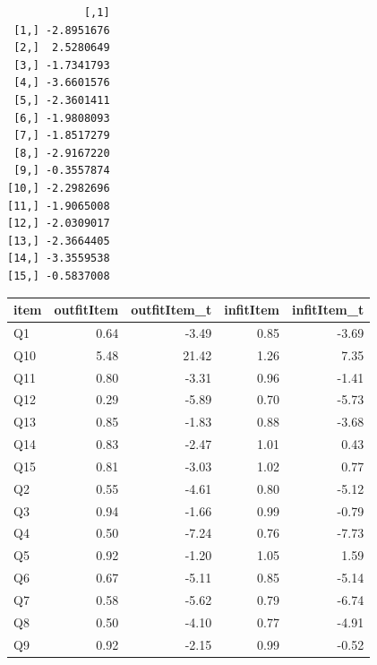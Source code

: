 \documentclass[
  letterpaper,
  DIV=11,
  numbers=noendperiod]{scrreprt}
\newenvironment{Shaded}{\begin{snugshade}}{\end{snugshade}}
\newcommand{\AttributeTok}[1]{\textcolor[rgb]{0.40,0.45,0.13}{#1}}
\newcommand{\CommentTok}[1]{\textcolor[rgb]{0.37,0.37,0.37}{#1}}
\newcommand{\ConstantTok}[1]{\textcolor[rgb]{0.56,0.35,0.01}{#1}}
\newcommand{\DecValTok}[1]{\textcolor[rgb]{0.68,0.00,0.00}{#1}}
\newcommand{\FunctionTok}[1]{\textcolor[rgb]{0.28,0.35,0.67}{#1}}
\newcommand{\NormalTok}[1]{\textcolor[rgb]{0.00,0.23,0.31}{#1}}
\newcommand{\OtherTok}[1]{\textcolor[rgb]{0.00,0.23,0.31}{#1}}
\newcommand{\SpecialCharTok}[1]{\textcolor[rgb]{0.37,0.37,0.37}{#1}}
\begin{document}
\begin{verbatim}
            [,1]
 [1,] -2.8951676
 [2,]  2.5280649
 [3,] -1.7341793
 [4,] -3.6601576
 [5,] -2.3601411
 [6,] -1.9808093
 [7,] -1.8517279
 [8,] -2.9167220
 [9,] -0.3557874
[10,] -2.2982696
[11,] -1.9065008
[12,] -2.0309017
[13,] -2.3664405
[14,] -3.3559538
[15,] -0.5837008
\end{verbatim}

\begin{Shaded}
\end{Shaded}

\begin{longtable}[]{@{}lrrrr@{}}
\toprule\noalign{}
item & outfitItem & outfitItem\_t & infitItem & infitItem\_t \\
\midrule\noalign{}
\endhead
\bottomrule\noalign{}
\endlastfoot
Q1 & 0.64 & -3.49 & 0.85 & -3.69 \\
Q10 & 5.48 & 21.42 & 1.26 & 7.35 \\
Q11 & 0.80 & -3.31 & 0.96 & -1.41 \\
Q12 & 0.29 & -5.89 & 0.70 & -5.73 \\
Q13 & 0.85 & -1.83 & 0.88 & -3.68 \\
Q14 & 0.83 & -2.47 & 1.01 & 0.43 \\
Q15 & 0.81 & -3.03 & 1.02 & 0.77 \\
Q2 & 0.55 & -4.61 & 0.80 & -5.12 \\
Q3 & 0.94 & -1.66 & 0.99 & -0.79 \\
Q4 & 0.50 & -7.24 & 0.76 & -7.73 \\
Q5 & 0.92 & -1.20 & 1.05 & 1.59 \\
Q6 & 0.67 & -5.11 & 0.85 & -5.14 \\
Q7 & 0.58 & -5.62 & 0.79 & -6.74 \\
Q8 & 0.50 & -4.10 & 0.77 & -4.91 \\
Q9 & 0.92 & -2.15 & 0.99 & -0.52 \\
\end{longtable}
\end{document}
